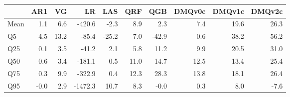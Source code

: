 \begin{tabular}{lrrrrrrrrr}
\toprule
 & AR1 & VG & LR & LAS & QRF & QGB & DMQv0c & DMQv1c & DMQv2c \\
\midrule
Mean & 1.1 & 6.6 & -420.6 & -2.3 & 8.9 & 2.3 & 7.4 & 19.6 & 26.3 \\
Q5 & 4.5 & 13.2 & -85.4 & -25.2 & 7.0 & -42.9 & 0.6 & 38.2 & 56.2 \\
Q25 & 0.1 & 3.5 & -41.2 & 2.1 & 5.8 & 11.2 & 9.9 & 20.5 & 31.0 \\
Q50 & 0.6 & 3.4 & -181.1 & 0.5 & 11.0 & 14.7 & 12.5 & 13.4 & 25.4 \\
Q75 & 0.3 & 9.9 & -322.9 & 0.4 & 12.3 & 28.3 & 13.8 & 18.1 & 26.4 \\
Q95 & -0.0 & 2.9 & -1472.3 & 10.7 & 8.3 & -0.0 & 0.3 & 8.0 & -7.6 \\
\bottomrule
\end{tabular}
